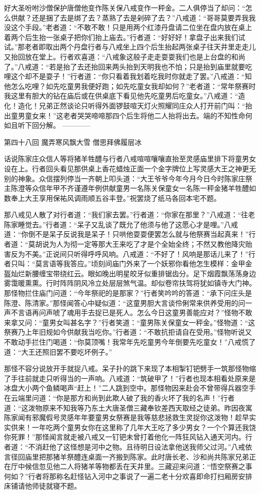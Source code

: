 \documentclass[12pt,UTF8]{ctexbook}
\begin{document}
好大圣吩咐沙僧保护唐僧他变作陈关保八戒变作一秤金。二人俱停当了却问：“怎么供献？还是捆了去是绑了去？蒸熟了去是剁碎了去？”八戒道：“哥哥莫要弄我我没这个手段。”老者道：“不敢不敢！只是用两个红漆丹盘请二位坐在盘内放在桌上着两个后生抬一张桌子把你们抬上庙去。”行者道：“好好好！拿盘子出来我们试试。”那老者即取出两个丹盘行者与八戒坐上四个后生抬起两张桌子往天井里走走儿又抬回放在堂上。行者欢喜道：“八戒象这般子走走耍耍我们也是上台盘的和尚了。”八戒道：“若是抬了去还抬回来两头抬到天明我也不怕；只是抬到庙里就要吃哩这个却不是耍子！”行者道：“你只看着我划着吃我时你就走了罢。”八戒道：“知他怎么吃哩？如先吃童男我便好跑；如先吃童女我却如何？”老者道：“常年祭赛时我这里有胆大的钻在庙后或在供桌底下看见他先吃童男后吃童女。”八戒道：“造化！造化！兄弟正然谈论只听得外面锣鼓喧天灯火照耀同庄众人打开前门叫：“抬出童男童女来！”这老者哭哭啼啼那四个后生将他二人抬将出去。端的不知性命何如且听下回分解。
------------

第四十八回 魔弄寒风飘大雪 僧思拜佛履层冰

话说陈家庄众信人等将猪羊牲醴与行者八戒喧喧嚷嚷直抬至灵感庙里排下将童男女设在上。行者回头看见那供桌上香花蜡烛正面一个金字牌位上写灵感大王之神更无别的神象。众信摆列停当一齐朝上叩头道：“大王爷爷今年今月今日今时陈家庄祭主陈澄等众信年甲不齐谨遵年例供献童男一名陈关保童女一名陈一秤金猪羊牲醴如数奉上大王享用保祐风调雨顺五谷丰登。”祝罢烧了纸马各回本宅不题。

那八戒见人散了对行者道：“我们家去罢。”行者道：“你家在那里？”八戒道：“往老陈家睡觉去。”行者道：“呆子又乱谈了既允了他须与他了这愿心才是哩。”八戒道：“你倒不是呆子反说我是呆子！只哄他耍耍便罢怎么就与他祭赛当起真来！”行者道：“莫胡说为人为彻一定等那大王来吃了才是个全始全终；不然又教他降灾贻害反为不美。”正说间只听得呼呼风响。八戒道：“不好了！风响是那话儿来了！”行者只叫：“莫言语等我答应。”顷刻间庙门外来了一个妖邪你看他怎生模样：金甲金盔灿烂新腰缠宝带绕红云。眼如晚出明星皎牙似重排锯齿分。足下烟霞飘荡荡身边雾霭暖熏熏。行时阵阵阴风冷立处层层煞气温。却似卷帘扶驾将犹如镇寺大门神。那怪物拦住庙门问道：“今年祭祀的是那家？”行者笑吟吟的答道：“承下问庄头是陈澄、陈清家。”那怪闻答心中疑似道：“这童男胆大言谈伶俐常来供养受用的问一声不言语再问声唬了魂用手去捉已是死人。怎么今日这童男善能应对？”怪物不敢来拿又问：“童男女叫甚名字？”行者笑道：“童男陈关保童女一秤金。”怪物道：“这祭赛乃上年旧规如今供献我当吃你。”行者道：“不敢抗拒请自在受用。”怪物听说又不敢动手拦住门喝道：“你莫顶嘴！我常年先吃童男今年倒要先吃童女！”八戒慌了道：“大王还照旧罢不要吃坏例子。”

那怪不容分说放开手就捉八戒。呆子扑的跳下来现了本相掣钉钯劈手一筑那怪物缩了手往前就走只听得当的一声响。八戒道：“筑破甲了！”行者也现本相看处原来是冰盘大小两个鱼鳞喝声“赶上！”二人跳到空中。那怪物因来赴会不曾带得兵器空手在云端里问道：“你是那方和尚到此欺人破了我的香火坏了我的名声！”行者道：“这泼物原来不知我等乃东土大唐圣僧三藏奉钦差西天取经之徒弟。昨因夜寓陈家闻有邪魔假号灵感年年要童男女祭赛是我等慈悲拯救生灵捉你这泼物！趁早实实供来！一年吃两个童男女你在这里称了几年大王吃了多少男女？一个个算还我饶你死罪！”那怪闻言就走被八戒又一钉钯未曾打着他化一阵狂风钻入通天河内。行者道：“不消赶他了这怪想是河中之物。且待明日设法拿他送我师父过河。”八戒依言径回庙里把那猪羊祭醴连桌面一齐搬到陈家。此时唐长老、沙和尚共陈家兄弟正在厅中候信忽见他二人将猪羊等物都丢在天井里。三藏迎来问道：“悟空祭赛之事何如？”行者将那称名赶怪钻入河中之事说了一遍二老十分欢喜即命打扫厢房安排床铺请他师徒就寝不题。
\end{document}
